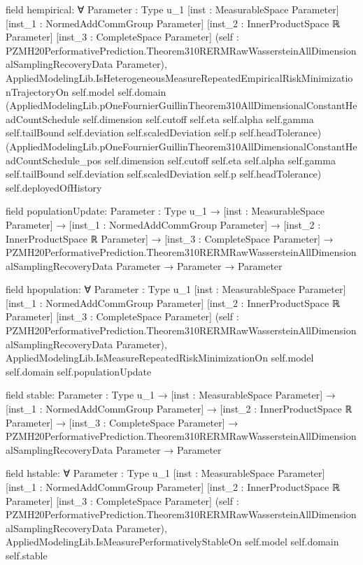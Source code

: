 \documentclass[10pt]{article}
\begin{document}
\begin{ReviewVerbatim}
field hempirical:
∀ {Parameter : Type u_1} [inst : MeasurableSpace Parameter] [inst_1 : NormedAddCommGroup Parameter]
  [inst_2 : InnerProductSpace ℝ Parameter] [inst_3 : CompleteSpace Parameter]
  (self : PZMH20PerformativePrediction.Theorem310RERMRawWassersteinAllDimensionalSamplingRecoveryData Parameter),
  AppliedModelingLib.IsHeterogeneousMeasureRepeatedEmpiricalRiskMinimizationTrajectoryOn self.model self.domain
    (AppliedModelingLib.pOneFournierGuillinTheorem310AllDimensionalConstantHeadCountSchedule self.dimension self.cutoff
      self.eta self.alpha self.gamma self.tailBound self.deviation self.scaledDeviation self.p self.headTolerance)
    (AppliedModelingLib.pOneFournierGuillinTheorem310AllDimensionalConstantHeadCountSchedule_pos self.dimension
      self.cutoff self.eta self.alpha self.gamma self.tailBound self.deviation self.scaledDeviation self.p
      self.headTolerance)
    self.deployedOfHistory

field populationUpdate:
{Parameter : Type u_1} →
  [inst : MeasurableSpace Parameter] →
    [inst_1 : NormedAddCommGroup Parameter] →
      [inst_2 : InnerProductSpace ℝ Parameter] →
        [inst_3 : CompleteSpace Parameter] →
          PZMH20PerformativePrediction.Theorem310RERMRawWassersteinAllDimensionalSamplingRecoveryData Parameter →
            Parameter → Parameter

field hpopulation:
∀ {Parameter : Type u_1} [inst : MeasurableSpace Parameter] [inst_1 : NormedAddCommGroup Parameter]
  [inst_2 : InnerProductSpace ℝ Parameter] [inst_3 : CompleteSpace Parameter]
  (self : PZMH20PerformativePrediction.Theorem310RERMRawWassersteinAllDimensionalSamplingRecoveryData Parameter),
  AppliedModelingLib.IsMeasureRepeatedRiskMinimizationOn self.model self.domain self.populationUpdate

field stable:
{Parameter : Type u_1} →
  [inst : MeasurableSpace Parameter] →
    [inst_1 : NormedAddCommGroup Parameter] →
      [inst_2 : InnerProductSpace ℝ Parameter] →
        [inst_3 : CompleteSpace Parameter] →
          PZMH20PerformativePrediction.Theorem310RERMRawWassersteinAllDimensionalSamplingRecoveryData Parameter →
            Parameter

field hstable:
∀ {Parameter : Type u_1} [inst : MeasurableSpace Parameter] [inst_1 : NormedAddCommGroup Parameter]
  [inst_2 : InnerProductSpace ℝ Parameter] [inst_3 : CompleteSpace Parameter]
  (self : PZMH20PerformativePrediction.Theorem310RERMRawWassersteinAllDimensionalSamplingRecoveryData Parameter),
  AppliedModelingLib.IsMeasurePerformativelyStableOn self.model self.domain self.stable


\end{ReviewVerbatim}
\end{document}
